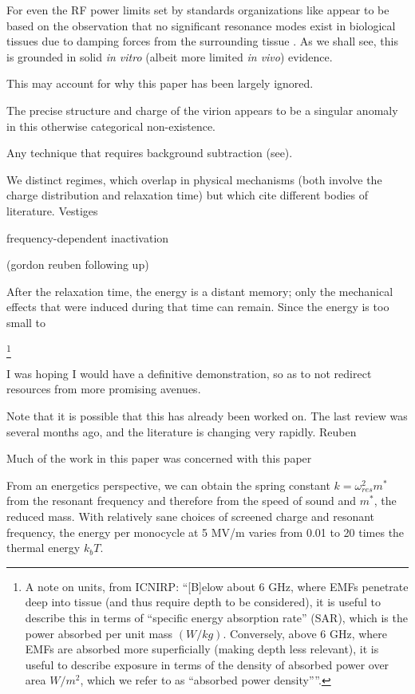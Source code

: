 \documentclass[paper.tex]{subfiles}
\begin{document}
\begin{multicols}{1}
For even the RF power limits set by standards organizations like \cite{ICNIRP2020} \cite{IEEE2006} appear to be based on the observation that no significant resonance modes exist in biological tissues due to damping forces from the surrounding tissue \cite{Vibrational2002}. As we shall see, this is grounded in solid {\it in vitro} (albeit more limited {\it in vivo}) evidence. 

This may account for why this paper has been largely ignored.

The precise structure and charge of the virion appears to be a singular anomaly in this otherwise categorical non-existence.





Any technique that requires background subtraction (see).


We distinct regimes, which overlap in physical mechanisms (both involve the charge distribution and relaxation time) but which cite different bodies of literature. Vestiges 

frequency-dependent inactivation

(gordon reuben following up)




After the relaxation time, the energy is a distant memory; only the mechanical effects that were induced during that time can remain. Since the energy is too small to 


\footnote{A note on units, from ICNIRP: ``{[B]elow about 6 GHz, where EMFs penetrate deep into tissue (and thus require depth to be considered), it is useful to describe this in terms of “specific energy absorption rate” (SAR), which is the power absorbed per unit mass $(W/kg)$. Conversely, above 6 GHz, where EMFs are absorbed more superficially (making depth less relevant), it is useful to describe exposure in terms of the density of absorbed power over area $W/m^2$, which we refer to as “absorbed power density”}''. }


I was hoping I would have a definitive demonstration, so as to not redirect resources from more promising avenues.


Note that it is possible that this has already been worked on. The last review was several months ago, and the literature is changing very rapidly. Reuben

Much of the work in this paper was concerned with this paper



From an energetics perspective, we can obtain the spring constant $k = \omega_{res}^2 m^*$ from the resonant frequency and therefore from the speed of sound and $m^*$, the reduced mass. With relatively sane choices of screened charge and resonant frequency, the energy per monocycle at 5 MV/m varies from 0.01 to 20 times the thermal energy $k_b T$. 


\end{multicols}
\end{document}
